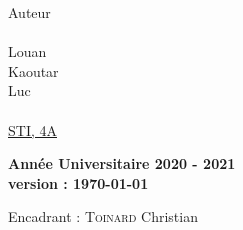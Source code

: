 \documentclass[a4paper, 12pt]{article}
\begin{document}


\begin{titlepage}
\setlength{\headheight}{0cm}
\setlength{\headsep}{0cm}
{

\makelogos

\vspace{4cm}

\begin{center}

\vspace{15mm}

Auteur\\~\\
{\large 
{} Louan\\
 Kaoutar\\
 Luc}\\
~\\
\underline{STI, 4A}\\ 

\vspace{3cm}  

\textbf{Année Universitaire 2020 - 2021\\
{\tiny version : \today}}

\vspace{2cm}  

\end{center}
  
\vfill

\begin{flushleft}
	Encadrant : \textsc{Toinard} Christian
\end{flushleft}

}
\end{titlepage}
\end{document}
